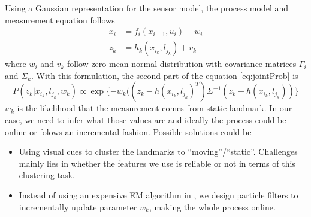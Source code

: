 Using a Gaussian representation for the sensor model, the process model and measurement equation follows
\begin{equation}
\begin{aligned}
x_i &= f_i(x_{i-1}, u_i) + w_i \\
z_k &= h_k(x_{i_k}, l_{j_k}) + v_k
\end{aligned}
\end{equation}
where $w_i$ and $v_k$ follow zero-mean normal distribution with covariance matrices $\Gamma_i$ and $\Sigma_k$. With this formulation, the second part of the equation \ref{eq:jointProb} is
\begin{equation}
P(z_k|x_{i_k}, l_{j_k}, w_k)\propto \exp\{-w_k((z_k - h(x_{i_k}, l_{j_k})^T)\Sigma^{-1}(z_k - h(x_{i_k}, l_{j_k}))\}
\label{eq:sensor}
\end{equation}
$w_k$ is the likelihood that the measurement comes from static landmark. In our case, we need to infer what those values are and ideally the process could be online or folows an incremental fashion. Possible solutions could be
\begin{itemize}
\item Using visual cues to cluster the landmarks to ``moving''/``static''. Challenges mainly lies in whether the features we use is reliable or not in terms of this clustering task.
\item Instead of using an expensive EM algorithm in \cite{rogers2010slam}, we design particle filters to incrementally update parameter $w_k$, making the whole process online.
\end{itemize}



